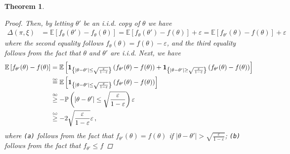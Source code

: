 \documentclass[letter, 12pt]{report}
\newcommand{\explan}[1]{\stackrel{\text{\tiny \texttt{#1}}}}
\newcommand{\paren}[1]{\left( #1 \right)}
\newcommand{\brak}[1]{\left[ #1 \right]}
\newcommand{\E}{\mathbb E}
\newcommand{\sind}{\bm{1}}
\newcommand{\1}{\mathbf{1}}
\renewcommand{\epsilon}{\varepsilon}
\theoremstyle{plain}
\newtheorem{theorem}{Theorem}
\theoremstyle{definition}
\theoremstyle{remark}
\begin{document}
\begin{theorem}
\begin{proof}
        Then, by letting $\theta'$ be an i.i.d. copy of $\theta$ we have
        \begin{align*}
            \Delta(\pi, \xi)
             & =
            \E\brak{
                f_{\theta}(\theta') - f_\theta(\theta)
            }
            =
            \E\brak{
                f_{\theta}(\theta') - f(\theta)
            } + \epsilon
            =
            \E\brak{
                f_{\theta'}(\theta) - f(\theta)
            } + \epsilon
        \end{align*}
        where the second equality follows $f_\theta(\theta) = f(\theta) - \epsilon$,
        and the third equality follows from the fact that $\theta$ and $\theta'$ are i.i.d.
        Next, we have
        \begin{align*}
            \E\brak{
                f_{\theta'}(\theta) - f(\theta)
            }
             & =
            \E\brak{
                \sind_{
                    \left\{
                    |\theta - \theta'| \leq \sqrt{\frac{\epsilon}{1-\epsilon}}
                    \right\}
                }
                \paren{
                    f_{\theta'}(\theta) - f(\theta)
                }
                +
                \sind_{
                    \left\{
                    |\theta - \theta'| \geq \sqrt{\frac{\epsilon}{1-\epsilon}}
                    \right\}
                }
                \paren{
                    f_{\theta'}(\theta) - f(\theta)
                }
            }    \\
             &
            \explan{(a)}
            =
            \E\brak{
                \sind_{
                    \left\{
                    |\theta - \theta'| \leq \sqrt{\frac{\epsilon}{1-\epsilon}}
                    \right\}
                }
                \paren{
                    f_{\theta'}(\theta) - f(\theta)
                }
            }
            \\
             &
            \explan{(b)}
            \geq
            -
            \mathbb{P}\paren{
                |\theta - \theta'| \leq \sqrt{\frac{\epsilon}{1-\epsilon}}
            }
            \epsilon
            \\
             &
            \explan{(c)}
            \geq
            -
            2 \sqrt{\frac{\epsilon}{1-\epsilon}}
            \epsilon\,,
        \end{align*}
        where \texttt{(a)} follows from the fact that $f_{\theta'}(\theta) = f(\theta)$
        if $|\theta - \theta'| > \sqrt{\frac{\epsilon}{1-\epsilon}}$;
        \texttt{(b)} follows from the fact that $f_{\theta'} \leq f$

\end{proof}
\end{theorem}
\end{document}
